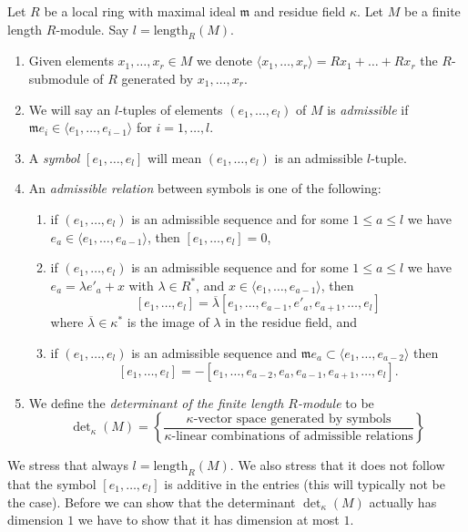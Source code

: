 \begin{definition}
\label{definition-determinant}
Let $R$ be a local ring with maximal ideal $\mathfrak m$ and
residue field $\kappa$. Let $M$ be a finite length $R$-module.
Say $l = \text{length}_R(M)$.
\begin{enumerate}
\item Given elements $x_1, \ldots, x_r \in M$ we denote
$\langle x_1, \ldots, x_r \rangle = Rx_1 + \ldots + Rx_r$ the
$R$-submodule of $R$ generated by $x_1, \ldots, x_r$.
\item We will say an $l$-tuples of elements
$(e_1, \ldots, e_l)$ of $M$ is {\it admissible} if
$\mathfrak m e_i \in \langle e_1, \ldots, e_{i - 1} \rangle$
for $i = 1, \ldots, l$.
\item A {\it symbol} $[e_1, \ldots, e_l]$ will mean
$(e_1, \ldots, e_l)$ is an admissible $l$-tuple.
\item An {\it admissible relation} between symbols is one of the following:
\begin{enumerate}
\item if $(e_1, \ldots, e_l)$ is an admissible sequence and
for some $1 \leq a \leq l$ we have
$e_a \in \langle e_1, \ldots, e_{a - 1}\rangle$, then
$[e_1, \ldots, e_l] = 0$,
\item if $(e_1, \ldots, e_l)$ is an admissible sequence and
for some $1 \leq a \leq l$ we have $e_a = \lambda e'_a + x$
with $\lambda \in R^*$, and
$x \in \langle e_1, \ldots, e_{a - 1}\rangle$, then
$$
[e_1, \ldots, e_l] =
\overline{\lambda} [e_1, \ldots, e_{a - 1}, e'_a, e_{a + 1}, \ldots, e_l]
$$
where $\overline{\lambda} \in \kappa^*$ is the image of $\lambda$ in
the residue field, and
\item if $(e_1, \ldots, e_l)$ is an admissible sequence and
$\mathfrak m e_a \subset \langle e_1, \ldots, e_{a - 2}\rangle$ then
$$
[e_1, \ldots, e_l] =
- [e_1, \ldots, e_{a - 2}, e_a, e_{a - 1}, e_{a + 1}, \ldots, e_l].
$$
\end{enumerate}
\item
We define the {\it determinant of the finite length $R$-module} to be
$$
\det\nolimits_\kappa(M) =
\left\{
\frac{\kappa\text{-vector space generated by symbols}}
{\kappa\text{-linear combinations of admissible relations}}
\right\}
$$
\end{enumerate}
\end{definition}

\noindent
We stress that always $l = \text{length}_R(M)$. We also stress that
it does not follow that the symbol $[e_1, \ldots, e_l]$ is
additive in the entries (this will typically not be the case).
Before we can show that the determinant $\det_\kappa(M)$ actually
has dimension $1$ we have to show that it has dimension at most $1$.

